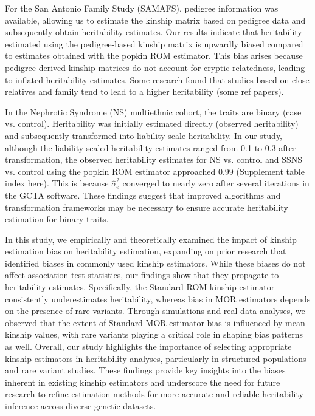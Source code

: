 \documentclass[11pt]{article}
\begin{document}
For the San Antonio Family Study (SAMAFS), pedigree information was available, allowing us to estimate the kinship matrix based on pedigree data and subsequently obtain heritability estimates. Our results indicate that heritability estimated using the pedigree-based kinship matrix is upwardly biased compared to estimates obtained with the popkin ROM estimator. This bias arises because pedigree-derived kinship matrices do not account for cryptic relatedness, leading to inflated heritability estimates. Some research found that studies based on close relatives and family tend to lead to a higher heritability (some ref papers).  


In the Nephrotic Syndrome (NS) multiethnic cohort, the traits are binary (case vs. control). Heritability was initially estimated directly (observed heritability) and subsequently transformed into liability-scale heritability. In our study, although the liability-scaled heritability estimates ranged from 0.1 to 0.3 after transformation, the observed heritability estimates for NS vs. control and SSNS vs. control using the popkin ROM estimator approached 0.99 (Supplement table index here). This is because $\hat{\sigma}^2_e$ converged to nearly zero after several iterations in the GCTA software. These findings suggest that improved algorithms and transformation frameworks may be necessary to ensure accurate heritability estimation for binary traits.

In this study, we empirically and theoretically examined the impact of kinship estimation bias on heritability estimation, expanding on prior research that identified biases in commonly used kinship estimators. While these biases do not affect association test statistics, our findings show that they propagate to heritability estimates. Specifically, the Standard ROM kinship estimator consistently underestimates heritability, whereas bias in MOR estimators depends on the presence of rare variants. Through simulations and real data analyses, we observed that the extent of Standard MOR estimator bias is influenced by mean kinship values, with rare variants playing a critical role in shaping bias patterns as well. Overall, our study highlights the importance of selecting appropriate kinship estimators in heritability analyses, particularly in structured populations and rare variant studies. These findings provide key insights into the biases inherent in existing kinship estimators and underscore the need for future research to refine estimation methods for more accurate and reliable heritability inference across diverse genetic datasets.
\end{document}
